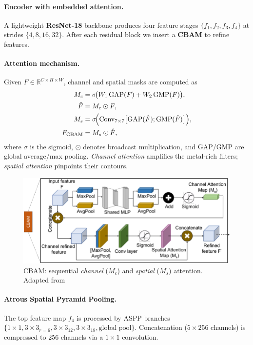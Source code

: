 \paragraph{Encoder with embedded attention.}
A lightweight \textbf{ResNet-18} backbone produces four feature stages
\(\{f_1,f_2,f_3,f_4\}\) at strides \(\{4,8,16,32\}\).
After each residual block we insert a \textbf{CBAM} to refine features.

\paragraph{Attention mechanism.}
Given \(F\in\mathbb{R}^{C\times H\times W}\), channel and spatial masks are
computed as
\begin{align}
  M_c &= \sigma\!\bigl(
           W_1\,\mathrm{GAP}(F)+
           W_2\,\mathrm{GMP}(F)
         \bigr),\\
  \hat F &= M_c \odot F,\\
  M_s &= \sigma\!\Bigl(
           \mathrm{Conv}_{7\times7}
           \bigl[\mathrm{GAP}(\hat F);\mathrm{GMP}(\hat F)\bigr]
         \Bigr),\\
  F_{\text{CBAM}} &= M_s \odot \hat F,
\end{align}
where \(\sigma\) is the sigmoid, \(\odot\) denotes broadcast multiplication,
and GAP/GMP are global average/max pooling. 
\emph{Channel attention} amplifies the metal-rich filters;
\emph{spatial attention} pinpoints their contours.

\begin{figure}
  \centering
  \includegraphics[width=.72\linewidth]{figs/cbam_block.png}
  \caption{CBAM: sequential \emph{channel} (\(M_c\)) and
           \emph{spatial} (\(M_s\)) attention. Adapted from}
  \label{fig:cbam}
\end{figure}

\paragraph{Atrous Spatial Pyramid Pooling.}
The top feature map \(f_4\) is processed by ASPP branches
\(\{1\times1, 3\times3_{r=6}, 3\times3_{12}, 3\times3_{18},
\text{global pool}\}\).
Concatenation (\(5\times256\) channels) is compressed to 256 channels
via a \(1\times1\) convolution.

